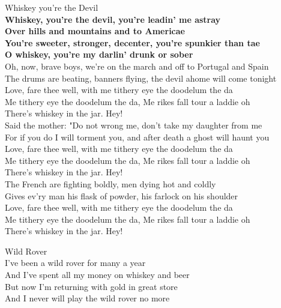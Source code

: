 \documentclass[letterpaper,9pt]{article}
\begin{document}
\newpage
{}
\Huge
Whiskey you're the Devil\\

\LARGE
\textbf{Whiskey, you're the devil, you're leadin' me astray \\
Over hills and mountains and to Americae \\
You're sweeter, stronger, decenter, you're spunkier than tae \\
O whiskey, you're my darlin' drunk or sober} \\

Oh, now, brave boys, we're on the march and off to Portugal and Spain \\
The drums are beating, banners flying, the devil ahome will come tonight \\
Love, fare thee well, with me tithery eye the doodelum the da \\
Me tithery eye the doodelum the da, Me rikes fall tour a laddie oh \\
There's whiskey in the jar. Hey! \\

Said the mother: "Do not wrong me, don't take my daughter from me \\
For if you do I will torment you, and after death a ghost will haunt you \\
Love, fare thee well, with me tithery eye the doodelum the da \\
Me tithery eye the doodelum the da, Me rikes fall tour a laddie oh \\
There's whiskey in the jar. Hey! \\

The French are fighting boldly, men dying hot and coldly \\
Gives ev'ry man his flask of powder, his farlock on his shoulder \\
Love, fare thee well, with me tithery eye the doodelum the da \\
Me tithery eye the doodelum the da, Me rikes fall tour a laddie oh \\
There's whiskey in the jar. Hey! \\

\newpage
{}
\Huge
Wild Rover\\

\LARGE
I’ve been a wild rover for many a year \\
And I’ve spent all my money on whiskey and beer \\
But now I’m returning with gold in great store \\
And I never will play the wild rover no more \\
\end{document}
